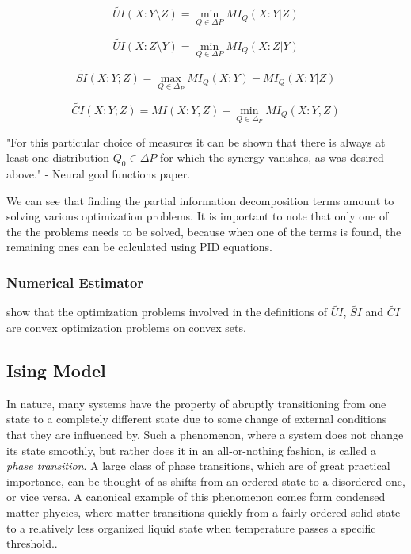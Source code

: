 \documentclass[12pt]{article}
\begin{document}
\begin{equation}
\widetilde{UI}(X:Y \setminus Z) = \min_{Q \in \Delta P} MI_Q(X:Y|Z)
\label{eq:tilde_ui_y}
\end{equation}

\begin{equation}
\widetilde{UI}(X:Z \setminus Y) = \min_{Q \in \Delta P} MI_Q(X:Z|Y)
\label{eq:tilde_ui_z}
\end{equation}

\begin{equation}
\widetilde{SI}(X:Y;Z) = \max_{Q \in \Delta_P} MI_Q (X:Y) - MI_Q(X:Y|Z)
\label{eq:tilde_si}
\end{equation}

\begin{equation}
\widetilde{CI}(X:Y;Z) = MI(X:Y,Z) - \min_{Q \in \Delta_P} MI_Q(X:Y,Z)
\label{eq:tilde_ci}
\end{equation}

"For this particular choice of measures it can be shown that there is
always at least one distribution $Q_0 \in \Delta P$ for which the synergy vanishes, as was desired above." - Neural goal functions paper.

We can see that finding the partial information decomposition terms amount to solving various optimization problems. It is important to note that only one of the the problems needs to be solved, because when one of the terms is found, the remaining ones can be calculated using PID equations.

\subsubsection{Numerical Estimator}

\cite{bertschinger} show that the optimization problems involved in the definitions of $\widetilde{UI}$, $\widetilde{SI}$ and $\widetilde{CI}$ are convex optimization problems on convex sets.

\newpage
\subsection{Ising Model}

In nature, many systems have the property of abruptly transitioning from one state to a completely different state due to some change of external conditions that they are influenced by. Such a phenomenon, where a system does not change its state smoothly, but rather does it in an all-or-nothing fashion, is called a \textit{phase transition}. A large class of phase transitions, which are of great practical importance, can be thought of as shifts from an ordered state to a disordered one, or vice versa. A canonical example of this phenomenon comes form condensed matter phycics, where matter transitions quickly from a fairly ordered solid state to a relatively less organized liquid state when temperature passes a specific threshold.\cite{inf-flow-ising-commentary}.
\end{document}
